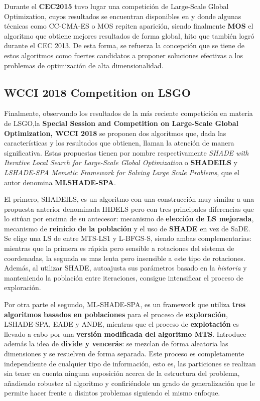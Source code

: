 Durante el \textbf{CEC2015} tuvo lugar una competición de Large-Scale Global Optimization, cuyos resultados se encuentran disponibles en \cite{CEC15-Res-LSGO} y donde algunas técnicas como CC-CMA-ES o MOS  repiten aparición, siendo finalmente \textbf{MOS} el algoritmo que obtiene mejores resultados de forma global, hito que también logró durante el CEC 2013. De esta forma, se refuerza la concepción que se tiene de estos algoritmos como fuertes candidatos a proponer soluciones efectivas a los problemas de optimización de alta dimensionalidad.

\subsection{WCCI 2018 Competition on LSGO}

Finalmente, observando los resultados de la más reciente competición en materia de LSGO,la \textbf{Special Session and Competition on Large-Scale Global Optimization, WCCI 2018} se proponen dos algoritmos que, dada las características y los resultados que obtienen, llaman la atención de manera significativa. Estas propuestas tienen por nombre respectivamente \textit{SHADE with Iterative Local Search for Large-Scale Global Optimization}\cite{SHADEILS} o \textbf{SHADEILS} y \textit{LSHADE-SPA Memetic Framework for Solving Large Scale Problems}\cite{ML-SHADE-SPA}, que el autor denomina \textbf{MLSHADE-SPA}.

El primero, SHADEILS, es un algoritmo con una construcción muy similar a una propuesta anterior denominada IHDELS\cite{IHDELS} pero con tres principales diferencias que lo sitúan por encima de su antecesor: mecanismo de \textbf{elección de LS mejorada}, mecanismo de \textbf{reinicio de la población} y el uso de \textbf{SHADE}\cite{SHADE} en vez de SaDE\cite{SaDE}. Se elige una LS de entre  MTS-LS1\cite{MTS-LSGO} y L-BFGS-S\cite{LBFGSB}, siendo ambas complementarias: mientras que la primera es rápida pero sensible a rotaciones del sistema de coordenadas, la segunda es mas lenta pero insensible a este tipo de rotaciones. Además, al utilizar SHADE, autoajusta sus parámetros basado en la \textit{historia} y manteniendo la población entre iteraciones, consigue intensificar el proceso de exploración. 

Por otra parte el segundo, ML-SHADE-SPA, es un framework que utiliza \textbf{tres algoritmos basados en poblaciones} para el proceso de \textbf{exploración}, LSHADE-SPA, EADE y ANDE, mientras que el proceso de \textbf{explotación} es llevado a cabo por una \textbf{versión modificada del algoritmo MTS}. Introduce además la idea de \textbf{divide y vencerás}: se mezclan de forma aleatoria las dimensiones y se resuelven de forma separada. Este proceso es completamente independiente de cualquier tipo de información, esto es, las particiones se realizan sin tener en cuenta ninguna suposición acerca de la estructura del problema, añadiendo robustez al algoritmo y confiriéndole un grado de generalización que le permite hacer frente a disintos problemas siguiendo el mismo enfoque.

